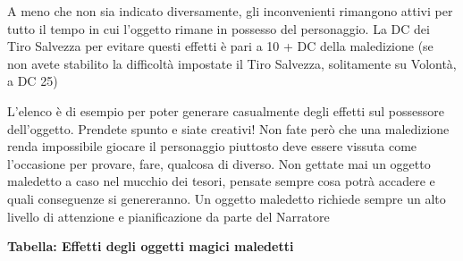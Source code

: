 \begin{multicols}{2}
	A meno che non sia indicato diversamente, gli inconvenienti rimangono attivi per tutto il tempo in cui l'oggetto rimane in possesso del personaggio. La DC dei Tiro Salvezza per evitare questi effetti è pari a 10 + DC della maledizione (se non avete stabilito la difficoltà impostate il Tiro Salvezza, solitamente su Volontà, a DC 25)

\end{multicols}

\medskip

\begin{changemargin}{0.3cm}{0.3cm}\begin{narratore}L'elenco è di esempio per poter generare casualmente degli effetti sul possessore dell'oggetto. Prendete spunto e siate creativi!  Non fate però che una maledizione renda impossibile giocare il personaggio piuttosto deve essere vissuta come l'occasione per provare, fare, qualcosa di diverso. Non gettate mai un oggetto maledetto a caso nel mucchio dei tesori, pensate sempre cosa potrà accadere e quali conseguenze si genereranno. Un oggetto maledetto richiede sempre un alto livello di attenzione e pianificazione da parte del Narratore\end{narratore}\end{changemargin}

\bigskip

\textbf{Tabella: Effetti degli oggetti magici maledetti}

\medskip

